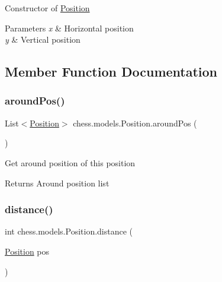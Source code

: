 Constructor of \mbox{\hyperlink{classchess_1_1models_1_1_position}{Position}}


\begin{DoxyParams}{Parameters}
{\em x} & Horizontal position \\
\hline
{\em y} & Vertical position \\
\hline
\end{DoxyParams}


\subsection{Member Function Documentation}
\mbox{\label{classchess_1_1models_1_1_position_a86f1df8c1f1a5303a0bb0386c5181eef}} 
\subsubsection{\texorpdfstring{around\+Pos()}{aroundPos()}}
{\footnotesize\ttfamily List$<$\mbox{\hyperlink{classchess_1_1models_1_1_position}{Position}}$>$ chess.\+models.\+Position.\+around\+Pos (\begin{DoxyParamCaption}{ }\end{DoxyParamCaption})}

Get around position of this position

\begin{DoxyReturn}{Returns}
Around position list 
\end{DoxyReturn}
\mbox{\label{classchess_1_1models_1_1_position_ad2ac6e3457056ccba6f1ccf3603f2554}} 
\subsubsection{\texorpdfstring{distance()}{distance()}}
{\footnotesize\ttfamily int chess.\+models.\+Position.\+distance (\begin{DoxyParamCaption}\item[{\mbox{\hyperlink{classchess_1_1models_1_1_position}{Position}}}]{pos }\end{DoxyParamCaption})}

